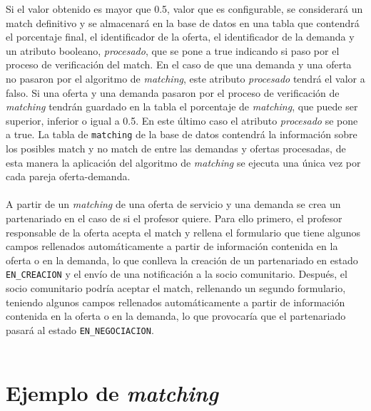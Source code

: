 \documentclass[11pt]{book}
\begin{document}
	Si el valor obtenido es mayor que 0.5, valor que es configurable, se considerará un match definitivo y se almacenará en la base de datos en una tabla que contendrá el porcentaje final, el identificador de la oferta, el identificador de la demanda y un atributo booleano, \emph{procesado}, que se pone a true indicando si paso por el proceso de verificación del match. En el caso de que una demanda y una oferta no pasaron por el algoritmo de \emph{matching}, este atributo \emph{procesado} tendrá el valor a falso. Si una oferta y una demanda pasaron por el proceso de verificación de \emph{matching} tendrán guardado en la tabla el porcentaje de \emph{matching}, que puede ser superior, inferior o igual a 0.5. En este último caso el atributo \emph{procesado} se pone a true. La tabla de \texttt{matching} de la base de datos contendrá la información sobre los posibles match y no match de entre las demandas y ofertas procesadas, de esta manera la aplicación del algoritmo de \emph{matching} se ejecuta una única vez por cada pareja oferta-demanda. \\\\
	
	A partir de un \emph{matching} de una oferta de servicio y una demanda se crea un partenariado en el caso de si el profesor quiere. Para ello primero, el profesor responsable de la oferta acepta el match y rellena el formulario que tiene algunos campos rellenados automáticamente a partir de información contenida en la oferta o en la demanda, lo que conlleva la creación de un partenariado en estado \texttt{EN\_CREACION} y el envío de una notificación a la socio comunitario. Después, el socio comunitario podría aceptar el match, rellenando un segundo formulario, teniendo algunos campos rellenados automáticamente a partir de información contenida en la oferta o en la demanda, lo que provocaría que el partenariado pasará al estado \texttt{EN\_NEGOCIACION}.\\\\
	
	\section{Ejemplo de \textit{matching}}
	
\end{document}
